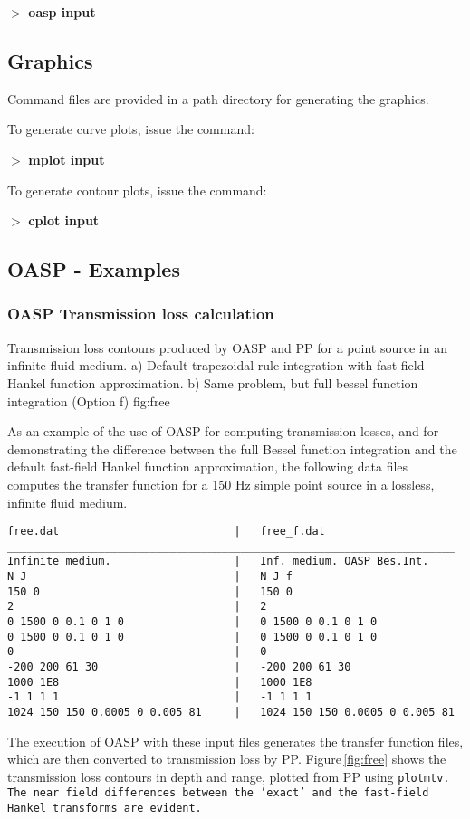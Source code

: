     $>$ {\bf oasp input}


\subsection{Graphics}  

    Command files are provided in a path directory for generating 
the graphics.

\noindent    To generate curve plots, issue the command:

    $>$ {\bf mplot input}

\noindent    To generate contour plots, issue the command:

    $>$ {\bf cplot input}

\newpage
\subsection{OASP - Examples}

\subsubsection{OASP Transmission loss calculation}

{Transmission loss contours produced by OASP and PP for a point source
in an infinite fluid medium. a) Default trapezoidal rule integration
with fast-field Hankel function approximation. b) Same problem, but
full bessel function integration (Option f)}
{fig:free}

As an example of the use of OASP for computing transmission losses,
and for demonstrating the difference between the full Bessel function
integration and the default fast-field Hankel function approximation,
the following data files computes the transfer function for a 150 Hz
simple point source in a lossless, infinite fluid medium.

\begin{verbatim}
free.dat                           |   free_f.dat
_____________________________________________________________________
Infinite medium.                   |   Inf. medium. OASP Bes.Int.
N J                                |   N J f  
150 0                              |   150 0
2                                  |   2
0 1500 0 0.1 0 1 0                 |   0 1500 0 0.1 0 1 0
0 1500 0 0.1 0 1 0                 |   0 1500 0 0.1 0 1 0
0                                  |   0
-200 200 61 30                     |   -200 200 61 30
1000 1E8                           |   1000 1E8
-1 1 1 1                           |   -1 1 1 1
1024 150 150 0.0005 0 0.005 81     |   1024 150 150 0.0005 0 0.005 81  
\end{verbatim}

The execution of OASP with these input files generates the transfer
function files, which are then converted to transmission loss by
PP. Figure\,\ref{fig:free} shows the transmission loss contours in
depth and range, plotted from PP using \tt plotmtv. The near field
differences between the 'exact' and the fast-field Hankel transforms
are evident.




